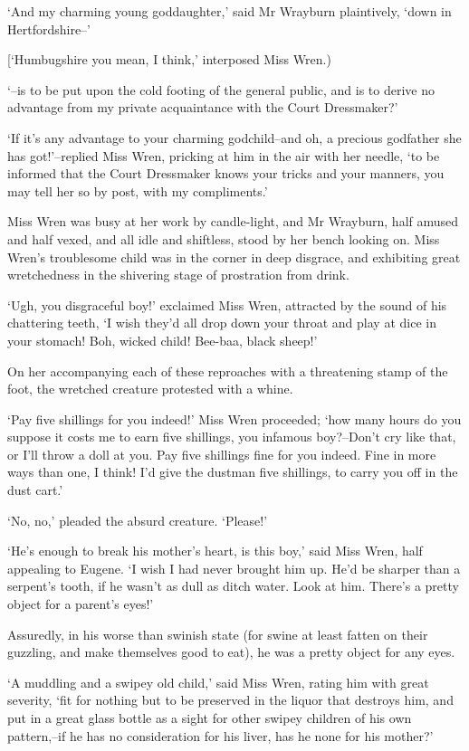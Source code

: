 ‘And my charming young goddaughter,’ said Mr Wrayburn plaintively, ‘down
in Hertfordshire--’

[‘Humbugshire you mean, I think,’ interposed Miss Wren.)

‘--is to be put upon the cold footing of the general public, and is
to derive no advantage from my private acquaintance with the Court
Dressmaker?’

‘If it’s any advantage to your charming godchild--and oh, a precious
godfather she has got!’--replied Miss Wren, pricking at him in the air
with her needle, ‘to be informed that the Court Dressmaker knows
your tricks and your manners, you may tell her so by post, with my
compliments.’

Miss Wren was busy at her work by candle-light, and Mr Wrayburn, half
amused and half vexed, and all idle and shiftless, stood by her bench
looking on. Miss Wren’s troublesome child was in the corner in deep
disgrace, and exhibiting great wretchedness in the shivering stage of
prostration from drink.

‘Ugh, you disgraceful boy!’ exclaimed Miss Wren, attracted by the sound
of his chattering teeth, ‘I wish they’d all drop down your throat and
play at dice in your stomach! Boh, wicked child! Bee-baa, black sheep!’

On her accompanying each of these reproaches with a threatening stamp of
the foot, the wretched creature protested with a whine.

‘Pay five shillings for you indeed!’ Miss Wren proceeded; ‘how many
hours do you suppose it costs me to earn five shillings, you infamous
boy?--Don’t cry like that, or I’ll throw a doll at you. Pay five
shillings fine for you indeed. Fine in more ways than one, I think! I’d
give the dustman five shillings, to carry you off in the dust cart.’

‘No, no,’ pleaded the absurd creature. ‘Please!’

‘He’s enough to break his mother’s heart, is this boy,’ said Miss Wren,
half appealing to Eugene. ‘I wish I had never brought him up. He’d be
sharper than a serpent’s tooth, if he wasn’t as dull as ditch water.
Look at him. There’s a pretty object for a parent’s eyes!’

Assuredly, in his worse than swinish state (for swine at least fatten on
their guzzling, and make themselves good to eat), he was a pretty object
for any eyes.

‘A muddling and a swipey old child,’ said Miss Wren, rating him with
great severity, ‘fit for nothing but to be preserved in the liquor
that destroys him, and put in a great glass bottle as a sight for other
swipey children of his own pattern,--if he has no consideration for his
liver, has he none for his mother?’

